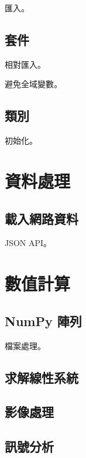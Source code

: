 \documentclass[a4paper,12pt]{book}
\theoremstyle{definition}
\begin{document}
匯入。

\chapter{套件}

相對匯入。

避免全域變數。

\chapter{類別}

初始化。

\part{資料處理}

\chapter{載入網路資料}

JSON API。

\part{數值計算}

\chapter{NumPy 陣列}

檔案處理。

\chapter{求解線性系統}

\chapter{影像處理}

\chapter{訊號分析}

\backmatter



\end{document}
